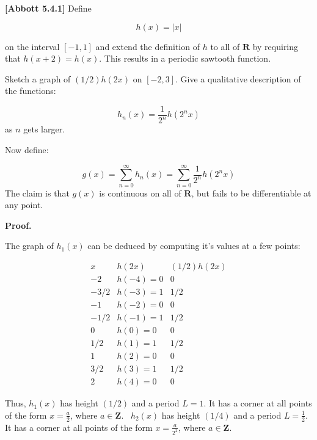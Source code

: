 \documentclass[10pt]{article}
\begin{document}
\textbf{[Abbott 5.4.1] }Define 


\begin{equation*}
h( x) =|x|
\end{equation*}


on the interval $\displaystyle [ -1,1]$ and extend the definition of $\displaystyle h$ to all of $\displaystyle \mathbf{R}$ by requiring that $\displaystyle h( x+2) =h( x)$. This results in a periodic sawtooth function. 



Sketch a graph of $\displaystyle ( 1/2) h( 2x)$ on $\displaystyle [ -2,3]$. Give a qualitative description of the functions:


\begin{equation*}
h_{n}( x) =\frac{1}{2^{n}} h\left( 2^{n} x\right)
\end{equation*}
as $\displaystyle n$ gets larger.



Now define:


\begin{equation*}
g( x) =\sum _{n=0}^{\infty } h_{n}( x) =\sum _{n=0}^{\infty }\frac{1}{2^{n}} h\left( 2^{n} x\right)
\end{equation*}
The claim is that $\displaystyle g( x)$ is continuous on all of $\displaystyle \mathbf{R}$, but fails to be differentiable at any point.



\textbf{Proof.}



The graph of $\displaystyle h_{1}( x)$ can be deduced by computing it's values at a few points:


\begin{equation*}
\begin{array}{ c|c|c }
x & h( 2x) & ( 1/2) h( 2x)\\
\hline
-2 & h( -4) =0 & 0\\
-3/2 & h( -3) =1 & 1/2\\
-1 & h( -2) =0 & 0\\
-1/2 & h( -1) =1 & 1/2\\
0 & h( 0) =0 & 0\\
1/2 & h( 1) =1 & 1/2\\
1 & h( 2) =0 & 0\\
3/2 & h( 3) =1 & 1/2\\
2 & h( 4) =0 & 0
\end{array}
\end{equation*}
 

Thus, $\displaystyle h_{1}( x)$ has height $\displaystyle ( 1/2)$ and a period $\displaystyle L=1$. It has a corner at all points of the form $\displaystyle x=\frac{a}{2}$, where $\displaystyle a\in \mathbf{Z}$. \ $\displaystyle h_{2}( x)$ has height $\displaystyle ( 1/4)$ and a period $\displaystyle L=\frac{1}{2}$. It has a corner at all points of the form $\displaystyle x=\frac{a}{2^{2}}$, where $\displaystyle a\in \mathbf{Z}$.
\end{document}
